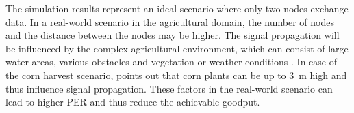 The simulation results represent an ideal scenario where only two nodes exchange data.
In a real-world scenario in the agricultural domain, the number of nodes and the distance between the nodes may be higher.
The signal propagation will be influenced by the complex agricultural environment,
which can consist of large water areas, various obstacles and vegetation or weather conditions \cite{brinkhoff_characterization_2017}.
In case of the corn harvest scenario, \textcite{smolnik_5g_2020} points out that corn plants can be up to \SI{3}{\metre} high
and thus influence signal propagation.
These factors in the real-world scenario can lead to higher \ac{PER} and thus reduce the achievable goodput.

